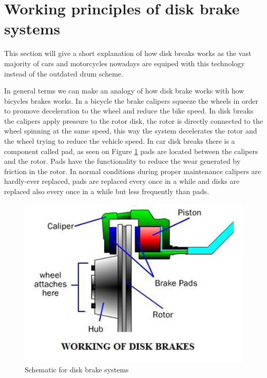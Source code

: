 \section{Working principles of disk brake systems}\label{sec:working-principles-of-disk-brake-systems}

		This section will give a short explanation of how disk breaks works as the vast majority of cars and motorcycles nowadays are equiped with this technology instead of the outdated drum scheme.
		\par
		In general terms we can make an analogy of how disk brake works with how bicycles brakes works. In a bicycle the brake calipers squeeze the wheels in order to promove deceleration to the wheel and reduce the bike speed. In disk breaks the calipers apply pressure to the rotor disk, the rotor is directly connected to the wheel spinning at the same speed, this way the system decelerates the rotor and the wheel trying to reduce the vehicle speed. In car disk breaks there is a component called pad, as seen on Figure \ref{fig:working-of-disk-breaks} pads are located between the calipers and the rotor. Pads have the functionality to reduce the wear generated by friction in the rotor. In normal conditions during proper maintenance calipers are hardly-ever replaced, pads are replaced every once in a while and disks are replaced also every once in a while but less frequently than pads.

		\begin{figure}[htbp]
			\centering
				\includegraphics[scale=0.55]{figuras/fig-disk_brake_working}
			\caption{Schematic for disk brake systems \cite{fig-working-of-disk-breaks}}
			\label{fig:working-of-disk-breaks}
		\end{figure}

